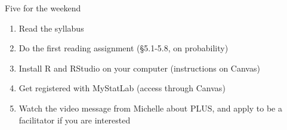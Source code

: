\documentclass{beamer}\usepackage[]{graphicx}\usepackage[]{color}
\begin{document}
\begin{darkframes}
    \begin{frame}{Five for the weekend}
      \begin{enumerate}
        \item Read the syllabus
        \item Do the first reading assignment (\S 5.1-5.8, on probability)
        \item Install R and RStudio on your computer (instructions on Canvas)
        \item Get registered with MyStatLab (access through Canvas)
        \item Watch the video message from Michelle about PLUS, and apply to be a facilitator if you are interested
      \end{enumerate}
    \end{frame}

  \end{darkframes}
\end{document}
